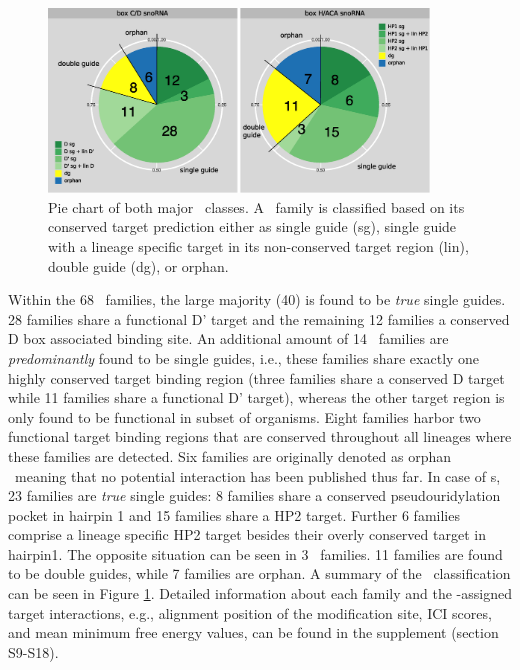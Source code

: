 \begin{figure}
  \centering
  \includegraphics[width=0.9\textwidth]{pics/pieCharts_snoRNAs_modified.eps}
  \caption[Classification of \sno\ families as single or double
  guides.]{Pie chart of both major \sno\ classes. A \sno\ family is
    classified based on its conserved target prediction either as
    single guide (sg), single guide with a lineage specific target in
    its non-conserved target region (lin), double guide (dg), or
    orphan.}
  \label{fig:pie_charts}
\end{figure}

Within the 68 \cd\ families, the large majority (40) is found to be
\textit{true} single guides. 28 families share a functional D' target
and the remaining 12 families a conserved D box associated binding
site. An additional amount of 14 \cd\ families are
\textit{predominantly} found to be single guides, i.e., these families
share exactly one highly conserved target binding region (three
families share a conserved D target while 11 families share a
functional D' target), whereas the other target region is only found
to be functional in subset of organisms. Eight families harbor two
functional target binding regions that are conserved throughout all
lineages where these families are detected.  Six families are
originally denoted as orphan \sno\ meaning that no potential
interaction has been published thus far. In case of \haca s, 23
families are \textit{true} single guides: 8 families share a conserved
pseudouridylation pocket in hairpin 1 and 15 families share a HP2
target. Further 6 families comprise a lineage specific HP2 target
besides their overly conserved target in hairpin1. The opposite
situation can be seen in 3 \haca\ families. 11 families are found to
be double guides, while 7 families are orphan. A summary of the \sno\
classification can be seen in Figure \ref{fig:pie_charts}.  Detailed
information about each family and the \snostrip-assigned target
interactions, e.g., alignment position of the modification site, ICI
scores, and mean minimum free energy values, can be found in the
supplement (section S9-S18).


